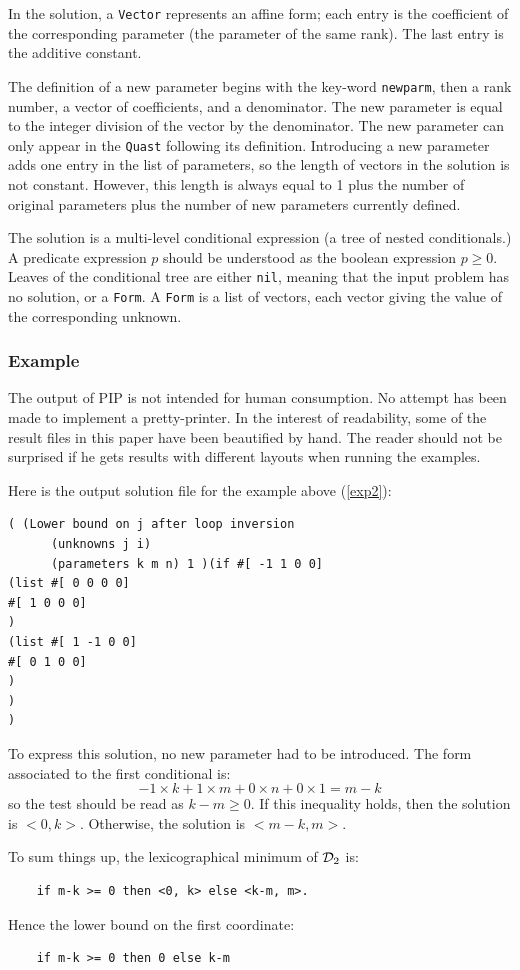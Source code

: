 \documentclass[12pt,a4paper]{article}
\begin{document}
In the solution, a {\tt Vector} represents an affine form; each entry
is the coefficient of the corresponding parameter (the parameter of
the same rank). The last entry is the additive constant.

The definition of a new parameter begins with the key-word
{\tt newparm}, then a rank number, a vector of coefficients, and a
denominator. The new parameter is equal to the integer division of the
vector by the denominator. The new parameter can only appear in the
{\tt Quast} following its definition. Introducing a new parameter adds
one entry in the list of parameters, so the length of vectors in the
solution is not constant. However, this length is always equal to 1 plus
the number of original parameters plus the number of new parameters
currently defined.

The solution is a multi-level conditional expression (a
tree of nested conditionals.) A predicate expression $p$ should be
understood as the boolean expression $p\geq 0$. Leaves of the
conditional tree are either {\tt nil}, meaning that the input problem
has no solution, or a {\tt Form}. A {\tt Form} is a list of vectors,
each vector giving the value of the corresponding unknown.

\subsubsection{Example}
The output of PIP is not intended for human consumption.
No attempt has been made to implement a pretty-printer. In the interest
of readability, some of the result files in this paper have been beautified
by hand. The reader should not be surprised if he gets results with
different layouts when running the examples.

Here is the output solution file for the example above (\ref{exp2}):
\begin{verbatim}
( (Lower bound on j after loop inversion
      (unknowns j i)
      (parameters k m n) 1 )(if #[ -1 1 0 0]
(list #[ 0 0 0 0]
#[ 1 0 0 0]
)
(list #[ 1 -1 0 0]
#[ 0 1 0 0]
)
)
)
\end{verbatim}
To express this solution, no new parameter had to be introduced. The
form associated to the first conditional is:
\[ -1 \times k + 1 \times m + 0 \times n + 0 \times 1 = m-k \]
so the test should be read as $k - m \geq 0$.  If this inequality
holds, then the solution is $<0, k>$. Otherwise, the solution is
$<m-k, m>$.

To sum things up, the lexicographical minimum of ${\cal D}_2$ is:
\begin{verbatim}
    if m-k >= 0 then <0, k> else <k-m, m>.
\end{verbatim}
Hence the lower bound on the first coordinate:
\begin{verbatim}
    if m-k >= 0 then 0 else k-m
\end{verbatim}
\end{document}

